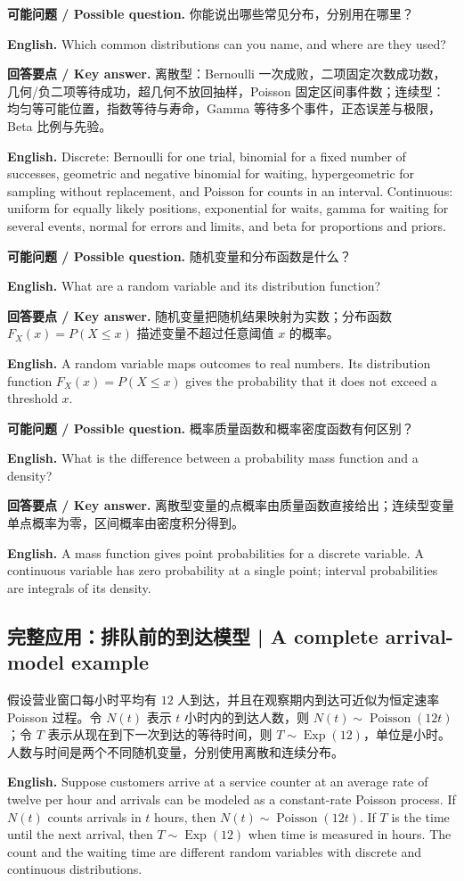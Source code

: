 \documentclass[UTF8,11pt,a4paper]{ctexart}
\newcommand{\EN}[1]{\par\noindent\textbf{English.} #1\par}
\newcommand{\ASK}[4]{\par\noindent\textbf{可能问题 / Possible question.} #1\par\EN{#2}\noindent\textbf{回答要点 / Key answer.} #3\par\EN{#4}\medskip}
\begin{document}
\ASK{你能说出哪些常见分布，分别用在哪里？}{Which common distributions can you name, and where are they used?}{离散型：Bernoulli 一次成败，二项固定次数成功数，几何/负二项等待成功，超几何不放回抽样，Poisson 固定区间事件数；连续型：均匀等可能位置，指数等待与寿命，Gamma 等待多个事件，正态误差与极限，Beta 比例与先验。}{Discrete: Bernoulli for one trial, binomial for a fixed number of successes, geometric and negative binomial for waiting, hypergeometric for sampling without replacement, and Poisson for counts in an interval. Continuous: uniform for equally likely positions, exponential for waits, gamma for waiting for several events, normal for errors and limits, and beta for proportions and priors.}

\ASK{随机变量和分布函数是什么？}{What are a random variable and its distribution function?}{随机变量把随机结果映射为实数；分布函数 $F_X(x)=P(X\le x)$ 描述变量不超过任意阈值 $x$ 的概率。}{A random variable maps outcomes to real numbers. Its distribution function $F_X(x)=P(X\le x)$ gives the probability that it does not exceed a threshold $x$.}

\ASK{概率质量函数和概率密度函数有何区别？}{What is the difference between a probability mass function and a density?}{离散型变量的点概率由质量函数直接给出；连续型变量单点概率为零，区间概率由密度积分得到。}{A mass function gives point probabilities for a discrete variable. A continuous variable has zero probability at a single point; interval probabilities are integrals of its density.}

\subsection{完整应用：排队前的到达模型 | A complete arrival-model example}
\noindent 假设营业窗口每小时平均有 $12$ 人到达，并且在观察期内到达可近似为恒定速率 Poisson 过程。令 $N(t)$ 表示 $t$ 小时内的到达人数，则 $N(t)\sim\operatorname{Poisson}(12t)$；令 $T$ 表示从现在到下一次到达的等待时间，则 $T\sim\operatorname{Exp}(12)$，单位是小时。人数与时间是两个不同随机变量，分别使用离散和连续分布。
\EN{Suppose customers arrive at a service counter at an average rate of twelve per hour and arrivals can be modeled as a constant-rate Poisson process. If $N(t)$ counts arrivals in $t$ hours, then $N(t)\sim\operatorname{Poisson}(12t)$. If $T$ is the time until the next arrival, then $T\sim\operatorname{Exp}(12)$ when time is measured in hours. The count and the waiting time are different random variables with discrete and continuous distributions.}
\end{document}
